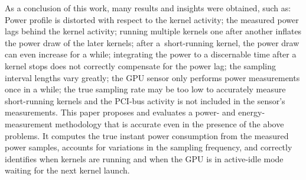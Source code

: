 As a conclusion of this work, many results and insights were
obtained, such as: Power profile is distorted with respect to the
kernel activity; the measured power lags behind the kernel
activity; running multiple kernels one after another inflates the
power draw of the later kernels; after a~short-running kernel, the
power draw can even increase for a while; integrating the power to
a discernable time after a kernel stops does not correctly
compensate for the power lag; the sampling interval lengths vary
greatly; the GPU sensor only performs power measurements once in
a while; the true sampling rate may be too low to accurately
measure short-running kernels and the PCI-bus activity is not
included in the sensor's measurements. This paper proposes and
evaluates a power- and energy-measurement methodology that is
accurate even in the presence of the above problems. It computes
the true instant power consumption from the measured power samples,
accounts for variations in the sampling frequency, and correctly
identifies when kernels are running and when the GPU is in
active-idle mode waiting for the next kernel launch.
